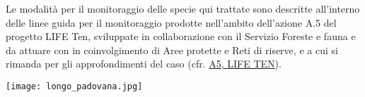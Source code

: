 \documentclass[10pt,twoside,openany,x11names,svgnames,italian,a5paper,dvipsnames,table]{memoir}
\begin{document}
Le modalità per il monitoraggio delle specie qui trattate sono descritte all'interno delle linee guida per il monitoraggio prodotte nell’ambito dell'azione A.5 del progetto LIFE Ten, sviluppate in collaborazione con il Servizio Foreste e fauna e da attuare con in coinvolgimento di Aree protette e Reti di riserve, e a cui si rimanda per gli approfondimenti del caso (cfr. \href{http://www.lifeten.tn.it/actions/preliminary_actions/pagina5.html}{A5, LIFE TEN}). 

\vspace*{\fill}
\begin{center}
\texttt{[image: longo\_padovana.jpg]}
\end{center}
\vspace*{\fill}


 \newpage
\setlength\afterchapskip{10mm}
\end{document}
